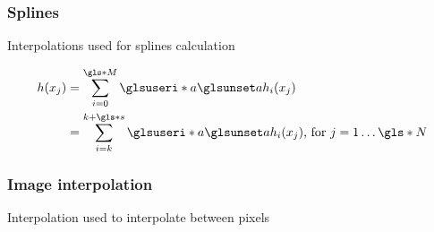 \subsubsection{Splines} 

Interpolations used for splines calculation
     
\begin{align*}
 h(x_j) &= \sum_{i=0}^{\g{M}}\gi{a} h_i(x_j)\\
 &= \sum_{i=k}^{k + \g{s}} \gi{a} h_i(x_j)\text{, for } j = 1 \ldots \g{N}
 \label{test}
\end{align*}

\subsubsection{Image interpolation} 

Interpolation used to interpolate between pixels


